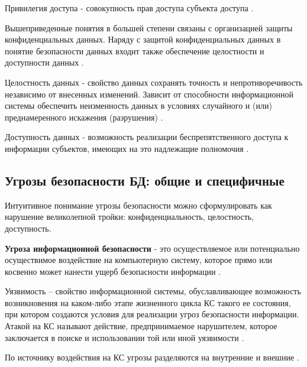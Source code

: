 Привилегия доступа - совокупность прав доступа субъекта доступа \autocite[сс. 15-18]{Skakun}. 

Вышеприведенные понятия в большей степени связаны с организацией защиты конфиденциальных данных. Наряду с защитой конфиденциальных данных в понятие безопасности данных входит также обеспечение целостности и доступности данных \autocite[сс. 15-18]{Skakun}.

Целостность данных - свойство данных сохранять точность и непротиворечивость независимо от внесенных изменений. Зависит от способности информационной системы обеспечить неизменность данных в условиях случайного и (или) преднамеренного искажения (разрушения) \autocite[сс. 15-18]{Skakun}.

Доступность данных - возможность реализации беспрепятственного доступа к информации субъектов, имеющих на это надлежащие полномочия \autocite[сс. 15-18]{Skakun}.

\subsection{Угрозы безопасности БД: общие и специфичные}
Интуитивное понимание угрозы безопасности можно сформулировать как нарушение великолепной тройки: конфиденциальность, целостность, доступность. 
\begin{grayquote}
\textbf{Угроза информационной безопасности} - это осуществляемое или потенциально осуществимое воздействие на компьютерную систему, которое прямо или косвенно может нанести ущерб безопасности информации \autocite[с. 19]{Skakun}.
\end{grayquote}
Уязвимость – свойство информационной системы, обуславливающее возможность возникновения на каком-либо этапе жизненного цикла КС такого ее состояния, при котором создаются условия для реализации угроз безопасности информации. Атакой на КС называют действие, предпринимаемое нарушителем, которое заключается в поиске и использовании той или иной уязвимости \autocite[с. 19]{Skakun}.

По источнику воздействия на КС угрозы разделяются на внутренние и внешние \autocite{Ytebov2008}.

